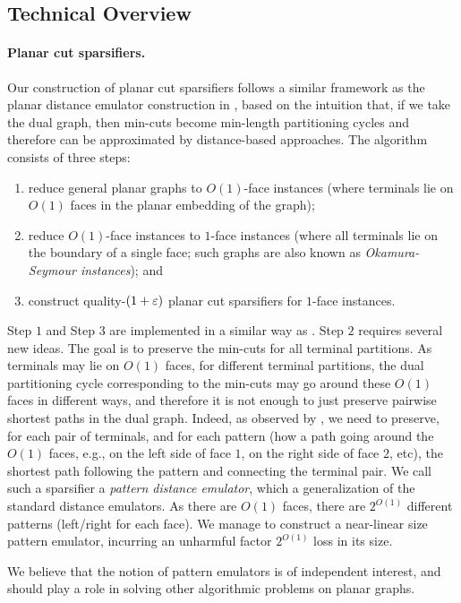 \subsection{Technical Overview}
\label{sec: tech_overview}

\paragraph{Planar cut sparsifiers.}
Our construction of planar cut sparsifiers follows a similar framework as the planar distance emulator construction in \cite{chang2022near}, based on the intuition that, if we take the dual graph, then min-cuts become min-length partitioning cycles and therefore can be approximated by distance-based approaches. The algorithm consists of three steps: 
\begin{enumerate}
\item reduce general planar graphs to $O(1)$-face instances (where terminals lie on $O(1)$ faces in the planar embedding of the graph);
\item reduce $O(1)$-face instances to $1$-face instances (where all terminals lie on the boundary of a single face; such graphs are also known as \emph{Okamura-Seymour instances}); and
\item construct quality-$(1+{\varepsilon})$ planar cut sparsifiers for $1$-face instances.
\end{enumerate}
Step $1$ and Step $3$ are implemented in a similar way as \cite{chang2022near}. Step $2$ requires several new ideas. The goal is to preserve the min-cuts for all terminal partitions. As terminals may lie on $O(1)$ faces, for different terminal partitions, the dual partitioning cycle corresponding to the min-cuts may go around these $O(1)$ faces in different ways, and therefore it is not enough to just preserve pairwise shortest paths in the dual graph. Indeed, as observed by \cite{krauthgamer2017refined}, we need to preserve, for each pair of terminals, and for each pattern (how a path going around the $O(1)$ faces, e.g., on the left side of face $1$, on the right side of face $2$, etc), the shortest path following the pattern and connecting the terminal pair. We call such a sparsifier a \emph{pattern distance emulator}, which a generalization of the standard distance emulators.
%
As there are $O(1)$ faces, there are $2^{O(1)}$ different patterns (left/right for each face). We manage to construct a near-linear size pattern emulator, incurring an unharmful factor $2^{O(1)}$ loss in its size. 

We believe that the notion of pattern emulators is of independent interest, and should play a role in solving other algorithmic problems on planar graphs.








